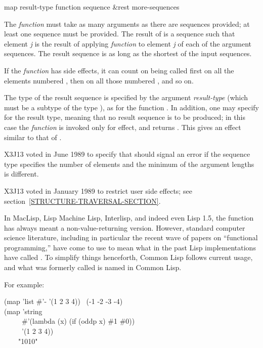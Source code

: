 \begin{defun}[Function]
map result-type function sequence &rest more-sequences

The \emph{function} must take as many arguments as there are sequences
provided; at least one sequence must be provided.
The result of  is a sequence such that element \emph{j} is the result
of applying \emph{function} to element \emph{j} of each of the argument
sequences.  The result sequence is as long as the shortest of the
input sequences.

If the \emph{function} has side effects, it can count on being called
first on all the elements numbered , then on all those
numbered , and so on.

The type of the result sequence is specified by the argument \emph{result-type}
(which must be a subtype of the type ),
as for the function .
In addition, one may specify {\nil} for the result type, meaning that no
result sequence is to be produced; in this case the \emph{function} is invoked
only for effect, and  returns {\nil}.  This gives an effect similar
to that of .

\begin{newer}
X3J13 voted in June 1989  to specify that
 should signal an error if the sequence type specifies the number of
elements and the minimum of the argument lengths is different.
\end{newer}

\begin{new}
X3J13 voted in January 1989
to restrict user side effects; see section~\ref{STRUCTURE-TRAVERSAL-SECTION}.
\end{new}

\beforenoterule
\begin{incompatibility}
In MacLisp, Lisp Machine Lisp, Interlisp, and indeed even
Lisp 1.5, the function  has always meant a non-value-returning
version.  However, standard computer science literature, including
in particular
the recent wave of papers on ``functional programming,'' have come
to use  to mean
what in the past Lisp implementations have called .
To simplify things henceforth, Common Lisp follows current usage,
and what was formerly called  is named  in Common Lisp.
\end{incompatibility}
\afternoterule

\noindent
For example:
\begin{lisp}
(map 'list \#'- '(1 2 3 4)) \EV\ (-1 -2 -3 -4) \\
(map 'string \\
~~~~~\#'(lambda (x) (if (oddp x) \#{\Xbackslash}1 \#{\Xbackslash}0)) \\
~~~~~'(1 2 3 4)) \\
~~~\EV\ "1010"
\end{lisp}
\end{defun}


